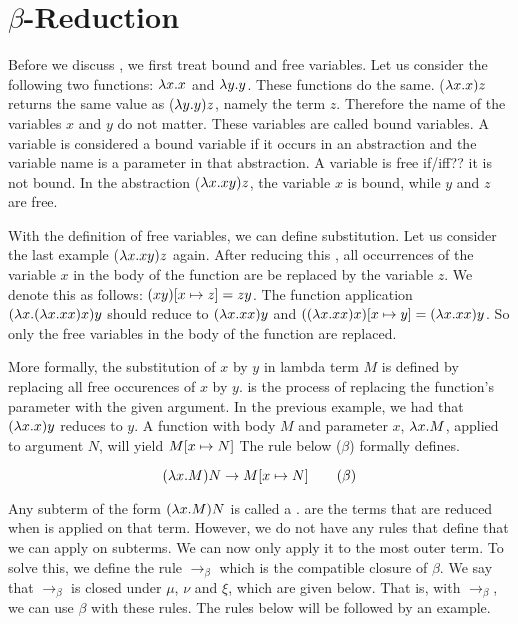 
\section{\texorpdfstring{\boldmath${\beta}$-Reduction}{Beta Reduction}}
Before we discuss \br, we first treat bound and free variables. Let us consider the following two functions: $\lambda x. x$ and $\lambda y. y$. These functions do the same.
($\lambda x. x) z$ returns the same value as ($\lambda y.y) z$, namely the term $z$. Therefore the name of the variables $x$ and $y$ do not matter. These variables are called bound variables.
A variable is considered a bound variable if it occurs in an abstraction and the variable name is a parameter in that abstraction. A variable is free if/iff?? it is not bound.
In the abstraction ($\lambda x. xy) z$, the variable $x$ is bound, while $y$ and $z$ are free.

With the definition of free variables, we can define substitution. Let us consider the last example ($\lambda x. xy) z$ again. After reducing this \lterm, all occurrences of the variable $x$ in the body of the function are be replaced by the variable $z$.
We denote this as follows: $(xy) [{x}\mapsto{z}] = zy$. The function application $(\lambda x. (\lambda x. x x) x)y$ should reduce to $(\lambda x. x x) y$ and $((\lambda x. x x) x) [{x}\mapsto{y}] = (\lambda x. x x) y$. So only the free variables in the body of the function are replaced.

More formally, the substitution of $x$ by $y$ in lambda term $M$ is defined by replacing all free occurences of $x$ by $y$.
\br is the process of replacing the function's parameter with the given argument. In the previous example, we had that $(\lambda x. x)y$ reduces to $y$.
A function with body $M$ and parameter $x$, $\lambda x. M$, applied to argument $N$, will yield $M [{x}\mapsto{N}]$
The rule below ($\beta$) formally defines. \br

\vspace{10pt}
\[
	(\lambda x. M)N \rightarrow M [{x}\mapsto{N}] \quad \quad (\beta)
\]

\vspace{10pt}
Any subterm of the form $(\lambda x. M) N$ is called a \bre. \bres are the terms that are reduced when \br is applied on that term.
However, we do not have any rules that define that we can apply \br on subterms. We can now only apply it to the most outer term.
To solve this, we define the rule $\rightarrow_\beta$ which is the compatible closure of $\beta$.
We say that $\rightarrow_\beta$ is closed under $\mu$, $\nu$ and $\xi$, which are given below. That is, with $\rightarrow_\beta$, we can use $\beta$ with these rules.
The rules below will be followed by an example.

